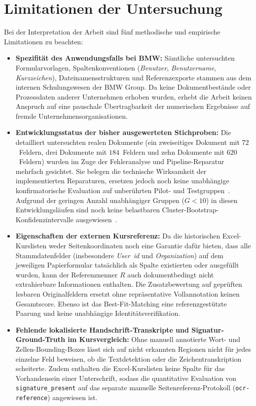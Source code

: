 \section{Limitationen der Untersuchung}
\label{sec:diskussion-limitationen}

Bei der Interpretation der Arbeit sind fünf methodische und empirische Limitationen zu beachten:
\begin{itemize}
  \item \textbf{Spezifität des Anwendungsfalls bei BMW:} Sämtliche untersuchten Formularvorlagen, Spaltenkonventionen (\emph{Benutzer}, \emph{Benutzername}, \emph{Kurzzeichen}), Dateinamensstrukturen und Referenzexporte stammen aus dem internen Schulungswesen der BMW Group. Da keine Dokumentbestände oder Prozessdaten anderer Unternehmen erhoben wurden, erhebt die Arbeit keinen Anspruch auf eine pauschale Übertragbarkeit der numerischen Ergebnisse auf fremde Unternehmensorganisationen.
  \item \textbf{Entwicklungsstatus der bisher ausgewerteten Stichproben:} Die detailliert untersuchten realen Dokumente (ein zweiseitiges Dokument mit $72$~Feldern, drei Dokumente mit $184$~Feldern und zehn Dokumente mit $620$~Feldern) wurden im Zuge der Fehleranalyse und Pipeline-Reparatur mehrfach gesichtet. Sie belegen die technische Wirksamkeit der implementierten Reparaturen, ersetzen jedoch noch keine unabhängige konfirmatorische Evaluation auf unberührten Pilot- und Testgruppen~\cite{Cawley2010SelectionBias}. Aufgrund der geringen Anzahl unabhängiger Gruppen ($G < 10$) in diesen Entwicklungsläufen sind noch keine belastbaren Cluster-Bootstrap-Konfidenzintervalle ausgewiesen~\cite{Field2007Cluster}.
  \item \textbf{Eigenschaften der externen Kursreferenz:} Da die historischen Excel-Kurslisten weder Seitenkoordinaten noch eine Garantie dafür bieten, dass alle Stammdatenfelder (insbesondere \emph{User~\ac{id}} und \emph{Organization}) auf dem jeweiligen Papierformular tatsächlich als Spalte existierten oder ausgefüllt wurden, kann der Referenznenner $R$ auch dokumentbedingt nicht extrahierbare Informationen enthalten. Die Zusatzbewertung auf gepr\"uften lesbaren Originalfeldern ersetzt ohne repr\"asentative Vollannotation keinen Gesamtscore. Ebenso ist das Best-Fit-Matching eine referenzgestützte Paarung und keine unabhängige Identitätsverifikation.
  \item \textbf{Fehlende lokalisierte Handschrift-Transkripte und Signatur-Ground-Truth im Kursvergleich:} Ohne manuell annotierte Wort- und Zellen-Bounding-Boxes lässt sich auf nicht erkannten Regionen nicht für jedes einzelne Feld beweisen, ob die Textdetektion oder die Zeichentranskription scheiterte. Zudem enthalten die Excel-Kurslisten keine Spalte für das Vorhandensein einer Unterschrift, sodass die quantitative Evaluation von \texttt{signature\_present} auf das separate manuelle Seitenreferenz-Protokoll (\texttt{ocr-reference}) angewiesen ist.

\end{itemize}
